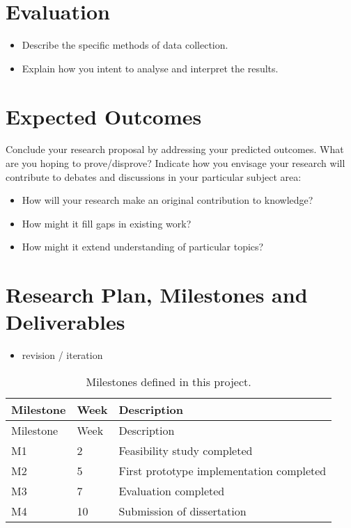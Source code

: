 \section{Evaluation}\label{evaluation}

\begin{itemize}
\item
  Describe the specific methods of data collection.
\item
  Explain how you intent to analyse and interpret the results.
\end{itemize}

\section{Expected Outcomes}\label{expected-outcomes}

Conclude your research proposal by addressing your predicted outcomes.
What are you hoping to prove/disprove? Indicate how you envisage your
research will contribute to debates and discussions in your particular
subject area:

\begin{itemize}
\item
  How will your research make an original contribution to knowledge?
\item
  How might it fill gaps in existing work?
\item
  How might it extend understanding of particular topics?
\end{itemize}

\section{Research Plan, Milestones and
Deliverables}\label{research-plan-milestones-and-deliverables}



\begin{itemize}
\tightlist
\item
  revision / iteration
\end{itemize}

\begin{longtable}[]{@{}lll@{}}
\caption{Milestones defined in this project.}\tabularnewline
\toprule\noalign{}
Milestone & Week & Description \\
\midrule\noalign{}
\endfirsthead
\toprule\noalign{}
Milestone & Week & Description \\
\midrule\noalign{}
\endhead
\bottomrule\noalign{}
\endlastfoot
M1 & 2 & Feasibility study completed \\
M2 & 5 & First prototype implementation completed \\
M3 & 7 & Evaluation completed \\
M4 & 10 & Submission of dissertation \\
\end{longtable}

